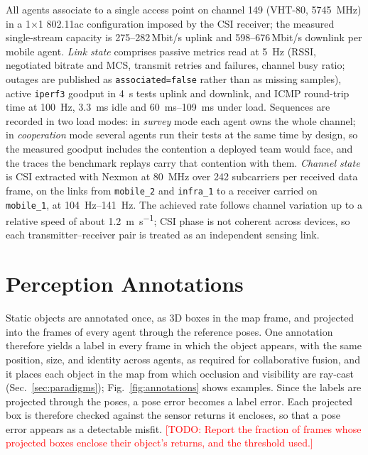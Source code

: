 \documentclass[journal]{IEEEtran}
\newcommand{\todo}[1]{\textcolor{red}{[TODO: #1]}}
\begin{document}
All agents associate to a single access point on channel 149 (VHT-80,
\SI{5745}{\mega\hertz}) in a 1$\times$1 802.11ac configuration imposed
by the CSI receiver; the measured single-stream capacity is
\numrange{275}{282}\,Mbit/s uplink and \numrange{598}{676}\,Mbit/s
downlink per mobile agent. \emph{Link state} comprises passive
metrics read at \SI{5}{\hertz} (RSSI, negotiated bitrate and MCS,
transmit retries and failures, channel busy ratio; outages are
published as \texttt{associated=false} rather than as missing
samples), active \texttt{iperf3} \cite{iperf3} goodput in
\SI{4}{\second} tests uplink and downlink, and ICMP round-trip time at
\SI{100}{\hertz}, \SI{3.3}{\milli\second} idle and
\SIrange{60}{109}{\milli\second} under load. Sequences are recorded in
two load modes: in \emph{survey} mode each agent owns the whole
channel; in \emph{cooperation} mode several agents run their tests at
the same time by design, so the measured goodput includes the
contention a deployed team would face, and the traces the benchmark
replays carry that contention with them. \emph{Channel state} is CSI
extracted with Nexmon \cite{nexmon} at \SI{80}{\mega\hertz} over 242
subcarriers per received data frame, on the links from
\texttt{mobile\_2} and \texttt{infra\_1} to a receiver carried on
\texttt{mobile\_1}, at \SIrange{104}{141}{\hertz}. The achieved rate
follows channel variation up to a relative speed of about
\SI{1.2}{\metre\per\second}; CSI phase is not coherent across devices,
so each transmitter--receiver pair is treated as an independent
sensing link.



\section{Perception Annotations}
\label{sec:annotations}
Static objects are annotated once, as 3D boxes in the map frame, and
projected into the frames of every agent through the reference
poses. One annotation therefore yields a label in every frame in
which the object appears, with the same position, size, and identity
across agents, as required for collaborative fusion, and it places
each object in the map from which occlusion and visibility are
ray-cast (Sec.~\ref{sec:paradigms}); Fig.~\ref{fig:annotations}
shows examples. Since the labels are projected
through the poses, a pose error becomes a label error. Each projected
box is therefore checked against the sensor returns it encloses, so
that a pose error appears as a detectable misfit. \todo{Report the
fraction of frames whose projected boxes enclose their object's
returns, and the threshold used.}
\end{document}
